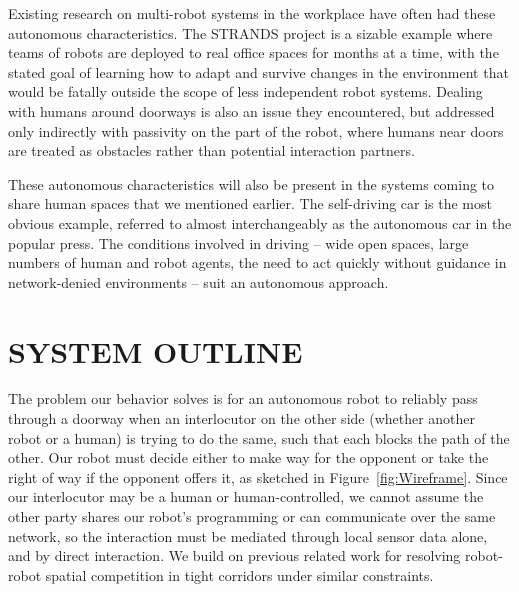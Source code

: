 \documentclass[letterpaper, 10 pt, conference]{ieeeconf}  %
\begin{document}

Existing research on multi-robot systems in the workplace have often had these autonomous characteristics. The STRANDS project\cite{c11} is a sizable example where teams of robots are deployed to real office spaces for months at a time, with the stated goal of learning how to adapt and survive changes in the environment that would be fatally outside the scope of less independent robot systems. Dealing with humans around doorways is also an issue they encountered, but addressed only indirectly with passivity on the part of the robot, where humans near doors are treated as obstacles rather than potential interaction partners.

These autonomous characteristics will also be present in the systems coming to share human spaces that we mentioned earlier. The self-driving car is the most obvious example, referred to almost interchangeably as the autonomous car in the popular press\cite{c12}. The conditions involved in driving – wide open spaces, large numbers of human and robot agents, the need to act quickly without guidance in network-denied environments – suit an autonomous approach.


\section{SYSTEM OUTLINE}

The problem our behavior solves is for an autonomous robot to reliably pass through a doorway when an interlocutor on the other side (whether another robot or a human) is trying to do the same, such that each blocks the path of the other. Our robot must decide either to make way for the opponent or take the right of way if the opponent offers it, as sketched in Figure~\ref{fig:Wireframe}. Since our interlocutor may be a human or human-controlled, we cannot assume the other party shares our robot’s programming or can communicate over the same network, so the interaction must be mediated through local sensor data alone, and by direct interaction. We build on previous related work for resolving robot-robot spatial competition in tight corridors under similar constraints.
\end{document}
